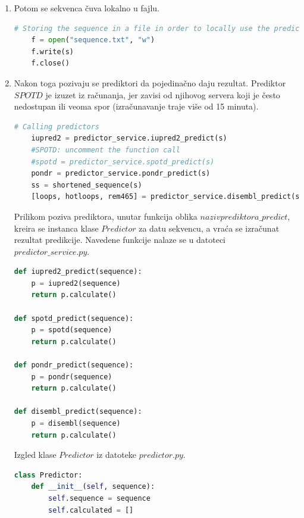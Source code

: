 \begin{enumerate}
\item Potom se sekvenca čuva lokalno u fajlu.
\begin{lstlisting}[language=Python]
 # Storing the sequence in a file in order to locally use the predictors
    f = open("sequence.txt", "w")
    f.write(s)
    f.close()
\end{lstlisting}
\item Nakon toga pozivaju se prediktori da pojedinačno daju rezultat. Prediktor $SPOTD$ je izuzet iz računanja, jer zavisi od njihovog servera koji je često nedostupan ili veoma spor (izračunavanje traje više od 15 minuta). 
\begin{lstlisting}[language=Python]
# Calling predictors
    iupred2 = predictor_service.iupred2_predict(s)
    #SPOTD: uncomment the function call 
    #spotd = predictor_service.spotd_predict(s) 
    pondr = predictor_service.pondr_predict(s)
    ss = shortened_sequence(s)
    [loops, hotloops, rem465] = predictor_service.disembl_predict(ss)
\end{lstlisting}
Prilikom poziva prediktora, unutar funkcija oblika $nazivprediktora\_predict$, kreira se instanca klase $Predictor$ za datu sekvencu, a vraća se izračunat rezultat predikcije. Navedene funkcije nalaze se u datoteci $predictor\_service.py$.
\begin{lstlisting}[language=Python]
def iupred2_predict(sequence):
    p = iupred2(sequence)
    return p.calculate()

def spotd_predict(sequence):
    p = spotd(sequence)
    return p.calculate()

def pondr_predict(sequence):
    p = pondr(sequence)
    return p.calculate()

def disembl_predict(sequence):
    p = disembl(sequence)
    return p.calculate() 
\end{lstlisting}
Izgled klase $Predictor$ iz datoteke $predictor.py$.
\begin{lstlisting}[language=Python]
class Predictor:
    def __init__(self, sequence):
        self.sequence = sequence
        self.calculated = []


\end{lstlisting}
\end{enumerate}
